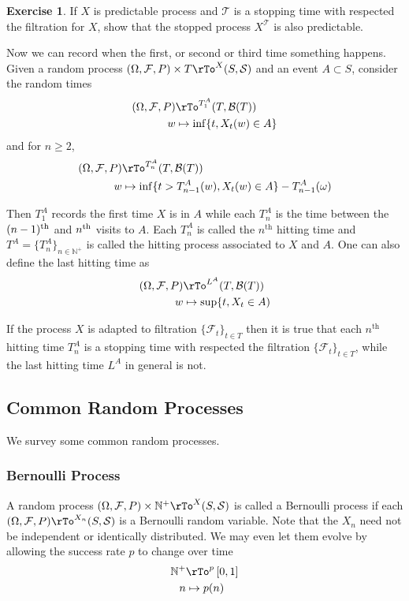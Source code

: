 \documentclass[12pt]{amsart}
\theoremstyle{definition}
\newtheorem{exercise}[theorem]{Exercise}
\begin{document}
\begin{exercise} If $X$ is predictable process and $\mathcal{T}$ is a stopping time with respected the filtration for $X$, show that the stopped process $X^{\mathcal{T}}$ is also predictable.
\end{exercise}

Now we can record when the first, or second or third time something happens. Given a random process $(\Omega, \mathcal{F}, P) \times T \rTo^X (S, \mathcal{S})$ and an event $A \subset S$, consider the random times
\begin{align*}
(\Omega, \mathcal{F}, P) & \rTo^{T_1^A} (T, \mathcal{B}(T)) \\
w & \mapsto \inf \{t, X_t(w) \in A\}
\end{align*}
and for $n \geq 2$,
\begin{align*}
(\Omega, \mathcal{F}, P) & \rTo^{T_n^A} (T, \mathcal{B}(T)) \\
w & \mapsto \inf \{t > T_{n-1}^A(w), X_t(w) \in A\} - T_{n-1}^A(\omega)
\end{align*}

Then $T_1^A$ records the first time $X$ is in $A$ while each $T_n^A$ is the time between the $(n-1)^{\textnormal{th}}$ and $n^{\textnormal{th}}$ visits to $A$. Each $T_n^A$ is called the $n^{\text{th}}$ hitting time and $T^A = \{T_n^A\}_{n \in \mathbb{N}^+}$ is called the hitting process associated to $X$ and $A$. One can also define the last hitting time as
\begin{align*}
(\Omega, \mathcal{F}, P) & \rTo^{L^A} (T, \mathcal{B}(T)) \\
w & \mapsto \sup \{t, X_t \in A)
\end{align*}

If the process $X$ is adapted to filtration $\{\mathcal{F}_t\}_{t \in T}$ then it is true that each $n^{\text{th}}$ hitting time $T_n^A$ is a stopping time with respected the filtration $\{\mathcal{F}_t\}_{t \in T}$, while the last hitting time $L^A$ in general is not.

\subsection{Common Random Processes} We survey some common random processes.

\subsubsection{Bernoulli Process} A random process $(\Omega, \mathcal{F}, P) \times \mathbb{N}^+ \rTo^X (S, \mathcal{S})$ is called a Bernoulli process if each $(\Omega, \mathcal{F}, P) \rTo^{X_n} (S, \mathcal{S})$ is a Bernoulli random variable. Note that the $X_n$ need not be independent or identically distributed. We may even let them evolve by allowing the success rate $p$ to change over time
\begin{align*}
\mathbb{N}^+ & \rTo^p \left[0, 1\right] \\
n & \mapsto p(n)
\end{align*}
\end{document}
